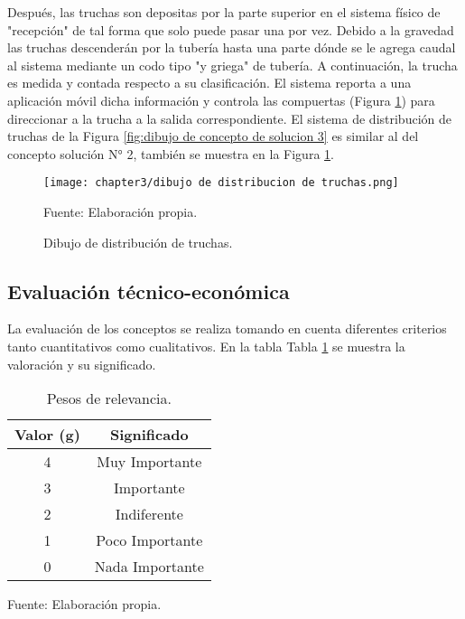 Después, las truchas son depositas por la parte superior en el sistema físico de "recepción" de tal forma que solo puede pasar una por vez. Debido a la gravedad las truchas descenderán por la tubería hasta una parte dónde se le agrega caudal al sistema mediante un codo tipo "y griega" de tubería. A continuación, la trucha es medida y contada respecto a su clasificación. El sistema reporta a una aplicación móvil dicha información y controla las compuertas (Figura \ref{fig:dibujo de distribucion de truchas}) para direccionar a la trucha a la salida correspondiente. El sistema de distribución de truchas  de la Figura \ref{fig:dibujo de concepto de solucion 3} es similar al del concepto solución N° 2, también se muestra en la Figura \ref{fig:dibujo de distribucion de truchas}.

\begin{figure}[H]
	\centering
	\texttt{[image: chapter3/dibujo de distribucion de truchas.png]}
	\caption{Dibujo de distribución de truchas.}
	\begin{myflushleftportland}
		Fuente: Elaboración propia.
	\end{myflushleftportland}
	\label{fig:dibujo de distribucion de truchas}
\end{figure}

\subsection{Evaluación técnico-económica}

La evaluación de los conceptos se realiza tomando en cuenta diferentes criterios tanto cuantitativos como cualitativos. En la tabla Tabla \ref{tab:pesos de relevancia} se muestra la valoración y su significado.

\begin{table}[H]
	\centering
	\caption{Pesos de relevancia.}
	\label{tab:pesos de relevancia}
	\begin{tabular}{|c|c|}
		\hline
		\rowcolor[HTML]{D9D9D9} 
		\textbf{Valor (g)} & \textbf{Significado} \\ \hline
		4                  & Muy Importante       \\ \hline
		3                  & Importante           \\ \hline
		2                  & Indiferente          \\ \hline
		1                  & Poco Importante      \\ \hline
		0                  & Nada Importante      \\ \hline
	\end{tabular}
\end{table}
\begin{myflushleftportland2}
	Fuente: Elaboración propia.
\end{myflushleftportland2}


